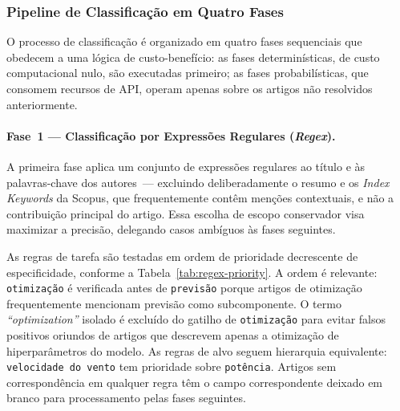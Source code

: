 \subsubsection{Pipeline de Classificação em Quatro Fases}

O processo de classificação é organizado em quatro fases sequenciais
que obedecem a uma lógica de custo-benefício: as fases
determinísticas, de custo computacional nulo, são executadas
primeiro; as fases probabilísticas, que consomem recursos de API,
operam apenas sobre os artigos não resolvidos anteriormente.

\paragraph{Fase~1 — Classificação por Expressões Regulares
(\textit{Regex}).}

A primeira fase aplica um conjunto de expressões regulares ao título
e às palavras-chave dos autores~--- excluindo deliberadamente o
resumo e os \textit{Index Keywords} da Scopus, que frequentemente
contêm menções contextuais, e não a contribuição principal do
artigo. Essa escolha de escopo conservador visa maximizar a
precisão, delegando casos ambíguos às fases seguintes.

As regras de tarefa são testadas em ordem de prioridade decrescente
de especificidade, conforme a Tabela~\ref{tab:regex-priority}. A
ordem é relevante: \texttt{otimização} é verificada antes de
\texttt{previsão} porque artigos de otimização frequentemente
mencionam previsão como subcomponente. O termo
\textit{``optimization''} isolado é excluído do gatilho de
\texttt{otimização} para evitar falsos positivos oriundos de artigos
que descrevem apenas a otimização de hiperparâmetros do modelo.
As regras de alvo seguem hierarquia equivalente: \texttt{velocidade
do vento} tem prioridade sobre \texttt{potência}. Artigos sem
correspondência em qualquer regra têm o campo correspondente
deixado em branco para processamento pelas fases seguintes.

